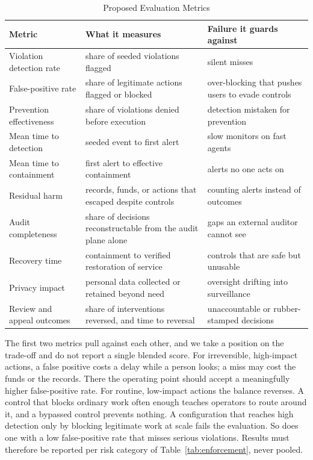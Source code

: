 \documentclass[journal]{IEEEtran}
\begin{document}
\begin{table}[!t]
\caption{Proposed Evaluation Metrics}
\label{tab:metrics}
\centering
\footnotesize
\setlength{\tabcolsep}{3pt}
\begin{tabular}{>{\raggedright\arraybackslash}p{1.85cm}>{\raggedright\arraybackslash}p{2.7cm}>{\raggedright\arraybackslash}p{2.6cm}}
\toprule
\rowcolor{darkblue!15}
\textbf{Metric} & \textbf{What it measures} & \textbf{Failure it guards against} \\
\midrule
\rowcolor{darkblue!5}
Violation detection rate & share of seeded violations flagged & silent misses \\

False-positive rate & share of legitimate actions flagged or blocked & over-blocking that pushes users to evade controls \\
\rowcolor{darkblue!5}
Prevention effectiveness & share of violations denied before execution & detection mistaken for prevention \\

Mean time to detection & seeded event to first alert & slow monitors on fast agents \\
\rowcolor{darkblue!5}
Mean time to containment & first alert to effective containment & alerts no one acts on \\

Residual harm & records, funds, or actions that escaped despite controls & counting alerts instead of outcomes \\
\rowcolor{darkblue!5}
Audit completeness & share of decisions reconstructable from the audit plane alone & gaps an external auditor cannot see \\

Recovery time & containment to verified restoration of service & controls that are safe but unusable \\
\rowcolor{darkblue!5}
Privacy impact & personal data collected or retained beyond need & oversight drifting into surveillance \\

Review and appeal outcomes & share of interventions reversed, and time to reversal & unaccountable or rubber-stamped decisions \\
\bottomrule
\end{tabular}
\end{table}

The first two metrics pull against each other, and we take a position on the trade-off and do not report a single blended score. For irreversible, high-impact actions, a false positive costs a delay while a person looks; a miss may cost the funds or the records. There the operating point should accept a meaningfully higher false-positive rate. For routine, low-impact actions the balance reverses. A control that blocks ordinary work often enough teaches operators to route around it, and a bypassed control prevents nothing. A configuration that reaches high detection only by blocking legitimate work at scale fails the evaluation. So does one with a low false-positive rate that misses serious violations. Results must therefore be reported per risk category of Table~\ref{tab:enforcement}, never pooled.
\end{document}
